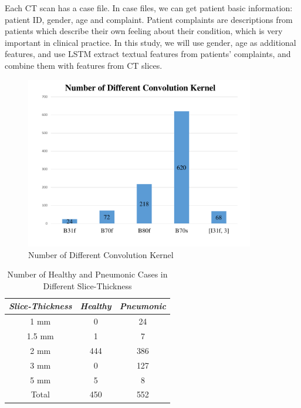 \documentclass[journal]{IEEEtran}
\begin{document}
Each CT scan has a case file. In case files, we can get patient basic information: patient ID, gender, age and complaint. Patient complaints are descriptions from patients which describe their own feeling about their condition, which is very important in clinical practice. In this study, we will use gender, age as additional features, and use LSTM extract textual features from patients' complaints, and combine them with features from CT slices.

\begin{figure}[t]
\centerline{\includegraphics[width=100mm]{NumberofDifferentConvolutionKernel.pdf}}
\vspace{-0cm}
\caption{Number of Different Convolution Kernel}
\vspace{-0cm}
\label{NumberofDifferentConvolutionKernel}
\end{figure}


\begin{table}[htb]
\vspace{-0cm}
\caption{Number of Healthy and Pneumonic Cases in Different Slice-Thickness}
\vspace{-0cm}
\begin{center}
\begin{tabular}{|c|c|c|}
\hline
\textbf{\textit{Slice-Thickness}}& \textbf{\textit{Healthy}}& \textbf{\textit{Pneumonic}}  \\
\hline
1 mm & 0 & 24 \\
1.5 mm  & 1 & 7\\
2 mm & 444 & 386  \\
3 mm & 0 & 127  \\
5 mm & 5 & 8  \\
\hline
Total & 450 & 552 \\
\hline
\end{tabular}
\vspace{-0cm}
\label{distributionofhealthyandpneumonic}
\end{center}
\vspace{-0cm}
\end{table}
\end{document}
